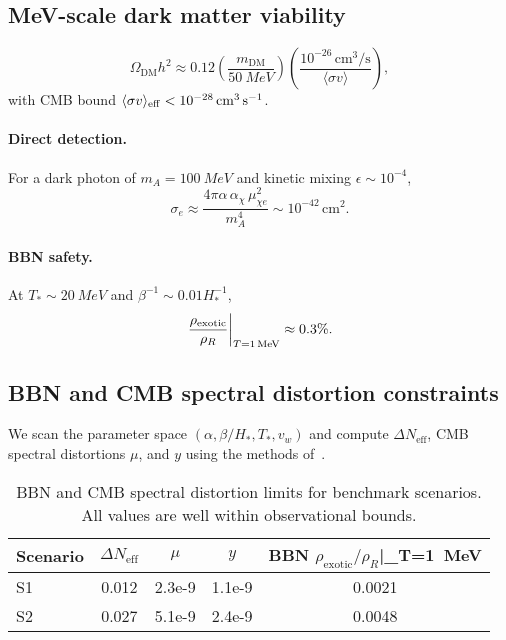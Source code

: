 \documentclass[preprint,aps,prd,onecolumn,nofootinbib,longbibliography]{revtex4-2}
\numberwithin{equation}{section}
\begin{document}
\subsection{MeV-scale dark matter viability}
\label{sec:dm}
\begin{equation}
\Omega_{\mathrm{DM}}h^2 \approx 0.12\left(\frac{m_{\mathrm{DM}}}{\SI{50}{MeV}}\right)\left(\frac{10^{-26}\,\mathrm{cm}^3/\mathrm{s}}{\langle\sigma v\rangle}\right),
\end{equation}
with CMB bound $\langle\sigma v\rangle_{\rm eff}<10^{-28}\,{\rm cm^3\,s^{-1}}$.
\paragraph*{Direct detection.}
For a dark photon of $m_A=\SI{100}{MeV}$ and kinetic mixing $\epsilon\sim 10^{-4}$,
\begin{equation}
\sigma_e\approx \frac{4\pi\alpha\,\alpha_\chi\,\mu_{\chi e}^2}{m_A^4}\sim 10^{-42}\,\mathrm{cm}^2.
\end{equation}
\paragraph*{BBN safety.}
At $T_*\!\sim\!\SI{20}{MeV}$ and $\beta^{-1}\!\sim\!0.01H_*^{-1}$,
\begin{equation}
\left.\frac{\rho_{\rm exotic}}{\rho_R}\right|_{T=\SI{1}{MeV}}\approx 0.3\%.
\end{equation}

\subsection{BBN and CMB spectral distortion constraints}
\label{sec:bbn_cmb}

We scan the parameter space \( (\alpha, \beta/H_*, T_*, v_w) \) and compute 
\( \Delta N_{\mathrm{eff}} \), CMB spectral distortions \( \mu \), and \( y \) using 
the methods of~\cite{Pisanti2008,Consiglio2018,Slatyer2016}.

\begin{table}[h]
\centering
\caption{
  BBN and CMB spectral distortion limits for benchmark scenarios.
  All values are well within observational bounds.
}
\begin{tabular}{l S[table-format=1.2e-1] S[table-format=1.1e-1] S[table-format=1.1e-1] S[table-format=1.1e-1]}
\toprule
{Scenario} & {\( \Delta N_{\mathrm{eff}} \)} & {\( \mu \)} & {\( y \)} & {BBN \( \rho_{\mathrm{exotic}}/\rho_R \)|_{T=\SI{1}{MeV}} } \\
\midrule
S1 & 0.012 & 2.3e-9 & 1.1e-9 & 0.0021 \\
S2 & 0.027 & 5.1e-9 & 2.4e-9 & 0.0048 \\
\bottomrule
\end{tabular}
\label{tab:bbn_cmb}
\end{table}
\end{document}
